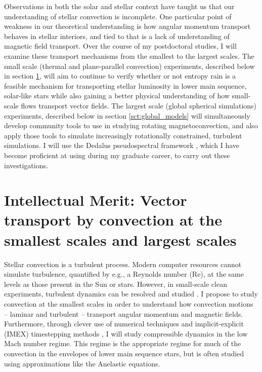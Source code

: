 \documentclass[aasms,12pt]{article}
\begin{document}
Observations in both the solar and stellar context have taught us that our understanding of stellar convection is incomplete.
One particular point of weakness in our theoretical understanding is how angular momentum transport behaves in stellar interiors, and tied to that is a lack of understanding of magnetic field transport.
Over the course of my postdoctoral studies, I will examine these transport mechanisms from the smallest to the largest scales.
The small scale (thermal and plane-parallel convection) experiments, described below in section \ref{sct:thermals}, will aim to continue to verify whether or not entropy rain is a feasible mechanism for transporting stellar luminosity in lower main sequence, solar-like stars while also gaining a better physical understanding of how small-scale flows transport vector fields.
The largest scale (global spherical simulations) experiments, described below in section \ref{sct:global_models} will simultaneously develop community tools to use in studying rotating magnetoconvection, and also apply those tools to simulate increasingly rotationally constrained, turbulent simulations.
I will use the Dedalus pseudospectral framework \citep{burns&all2019}, which I have become proficient at using during my graduate career, to carry out these investigations.

\section{Intellectual Merit: Vector transport by convection at the smallest scales and largest scales}
\label{sct:thermals}
Stellar convection is a turbulent process.
Modern computer resources cannot simulate turbulence, quantified by e.g., a Reynolds number (Re), at the same levels as those present in the Sun or stars.
However, in small-scale clean experiments, turbulent dynamics can be resolved and studied \citep[as in e.g.,][]{lecoanet&jeevanjee2019}.
I propose to study convection at the smallest scales in order to understand how convection motions -- laminar and turbulent -- transport angular momentum and magnetic fields.
Furthermore, through clever use of numerical techniques and implicit-explicit (IMEX) timestepping methods \citep{anders&brown2017}, I will study compressible dynamics in the low Mach number regime.
This regime is the appropriate regime for much of the convection in the envelopes of lower main sequence stars, but is often studied using approximations like the Anelastic equations.
\end{document}
